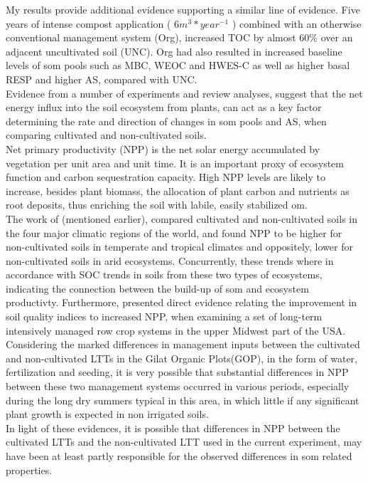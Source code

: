 	My results provide additional evidence supporting a similar line of evidence. Five years of intense compost application ( $ 6 m^3*year^{-1} $ ) combined with an otherwise conventional management system (Org), increased TOC by almost 60\% over an adjacent uncultivated soil (UNC). Org had also resulted in increased baseline levels of \gls{som} pools such as MBC, WEOC  and HWES-C  as well as higher basal RESP and higher AS, compared with UNC. \\
	Evidence from a number of experiments and review analyses, suggest that the net energy influx into the soil ecosystem from plants, can act as a key factor determining the rate and direction of changes in \gls{som} pools  and AS, when comparing cultivated and non-cultivated soils. \\
	Net primary productivity (NPP) is the net solar energy accumulated by vegetation per unit area and unit time. It is an important proxy of ecosystem function and carbon sequestration capacity\citep{jackson2016}. High NPP levels are likely to increase, besides plant biomass, the allocation of plant carbon and nutrients as root deposits, thus enriching the soil with labile, easily stabilized \gls{om}.  \\
	The work of \citet{trivedi2016} (mentioned earlier), compared cultivated and non-cultivated soils in the four major climatic regions of the world, and found NPP to be higher for non-cultivated soils in temperate and tropical climates and oppositely, lower for non-cultivated soils in arid ecosystems. Concurrently, these trends where in accordance with SOC trends in soils from these two types of ecosystems, indicating the connection between the build-up of \gls{som}  and ecosystem productivty. Furthermore, \citet{bhardwaj2011} presented direct evidence relating the improvement in soil quality indices to increased NPP, when examining a set of long-term intensively managed row crop systems in the upper Midwest part of the USA.\\
	Considering the marked differences in management inputs between the cultivated and non-cultivated LTTs in the Gilat Organic Plots(GOP), in the form of water, fertilization and seeding, it is very possible that substantial differences in NPP between these two management systems occurred in various periods, especially during the long dry summers typical in this area, in which little  if any significant plant growth is expected in non irrigated soils. \\
	In light of these evidences, it is possible that differences in NPP between the cultivated LTTs and the non-cultivated LTT used in the current experiment, may have been at least partly responsible for the observed differences in \gls{som} related properties.
